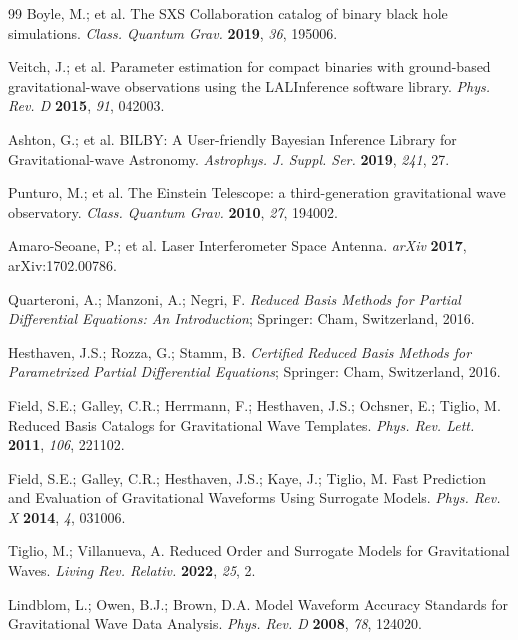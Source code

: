 \documentclass[11pt, a4paper]{article}
\begin{document}
\begin{thebibliography}{99}
\small
{}
Boyle, M.; et al. The SXS Collaboration catalog of binary black hole simulations. \textit{Class. Quantum Grav.} \textbf{2019}, \textit{36}, 195006.

Veitch, J.; et al. Parameter estimation for compact binaries with ground-based gravitational-wave observations using the LALInference software library. \textit{Phys. Rev. D} \textbf{2015}, \textit{91}, 042003.

Ashton, G.; et al. BILBY: A User-friendly Bayesian Inference Library for Gravitational-wave Astronomy. \textit{Astrophys. J. Suppl. Ser.} \textbf{2019}, \textit{241}, 27.

Punturo, M.; et al. The Einstein Telescope: a third-generation gravitational wave observatory. \textit{Class. Quantum Grav.} \textbf{2010}, \textit{27}, 194002.

Amaro-Seoane, P.; et al. Laser Interferometer Space Antenna. \textit{arXiv} \textbf{2017}, arXiv:1702.00786.

Quarteroni, A.; Manzoni, A.; Negri, F. \textit{Reduced Basis Methods for Partial Differential Equations: An Introduction}; Springer: Cham, Switzerland, 2016.

Hesthaven, J.S.; Rozza, G.; Stamm, B. \textit{Certified Reduced Basis Methods for Parametrized Partial Differential Equations}; Springer: Cham, Switzerland, 2016.

Field, S.E.; Galley, C.R.; Herrmann, F.; Hesthaven, J.S.; Ochsner, E.; Tiglio, M. Reduced Basis Catalogs for Gravitational Wave Templates. \textit{Phys. Rev. Lett.} \textbf{2011}, \textit{106}, 221102.

Field, S.E.; Galley, C.R.; Hesthaven, J.S.; Kaye, J.; Tiglio, M. Fast Prediction and Evaluation of Gravitational Waveforms Using Surrogate Models. \textit{Phys. Rev. X} \textbf{2014}, \textit{4}, 031006.

Tiglio, M.; Villanueva, A. Reduced Order and Surrogate Models for Gravitational Waves. \textit{Living Rev. Relativ.} \textbf{2022}, \textit{25}, 2.

Lindblom, L.; Owen, B.J.; Brown, D.A. Model Waveform Accuracy Standards for Gravitational Wave Data Analysis. \textit{Phys. Rev. D} \textbf{2008}, \textit{78}, 124020.


\end{thebibliography}
\end{document}
